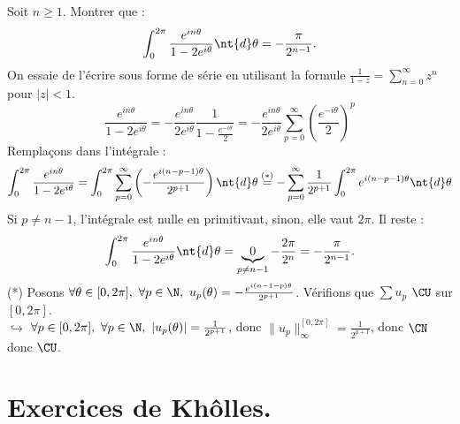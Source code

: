 \documentclass[11pt]{article}
\begin{document}
\begin{ex}{}{}
    Soit $n\geq 1$. Montrer que :
    \begin{equation*}
        \int_0^{2\pi}\frac{e^{in\theta}}{1-2e^{i\theta}}\nt{d}\theta = -\frac{\pi}{2^{n-1}}.
    \end{equation*}
    \tcblower
    On essaie de l'écrire sous forme de série en utilisant la formule $\frac{1}{1-z}=\sum_{n=0}^\infty z^n$ pour $|z|<1$.
    \begin{equation*}
        \frac{e^{in\theta}}{1-2e^{i\theta}} = -\frac{e^{in\theta}}{2e^{i\theta}} \frac{1}{1-\frac{e^{-i\theta}}{2}} = -\frac{e^{in\theta}}{2e^{i\theta}}\sum_{p=0}^{\infty}\left(\frac{e^{-i\theta}}{2}\right)^p
    \end{equation*}
    Remplaçons dans l'intégrale :
    \begin{equation*}
        \int_0^{2\pi}\frac{e^{in\theta}}{1-2e^{i\theta}} = \int_0^{2\pi} \sum_{p=0}^{\infty}\left( -\frac{e^{i(n-p-1)\theta}}{2^{p+1}} \right) \nt{d}\theta\overset{(*)}{=}-\sum_{p=0}^{\infty}\frac{1}{2^{p+1}}\int_0^{2\pi}e^{i(n-p-1)\theta}\nt{d}\theta
    \end{equation*}
    Si $p\neq n-1$, l'intégrale est nulle en primitivant, sinon, elle vaut $2\pi$. Il reste :
    \begin{equation*}
        \int_0^{2\pi}\frac{e^{in\theta}}{1-2e^{i\theta}}\nt{d}\theta = \underbrace{0}_{p\neq n-1}-\frac{2\pi}{2^n} = -\frac{\pi}{2^{n-1}}.
    \end{equation*}
    (*) Posons $\forall \theta \in [0,2\pi], ~ \forall p \in \N, ~ u_p(\theta)=-\frac{e^{i(n-1-p)\theta}}{2^{p+1}}$. Vérifions que $\sum u_p$ $\CU$ sur $[0,2\pi]$.\\
    $\hookrightarrow$ $\forall p \in [0,2\pi], ~ \forall p \in \N, ~ |u_p(\theta)|=\frac{1}{2^{p+1}}$, donc $\|u_p\|_\infty^{[0,2\pi]}=\frac{1}{2^{p+1}}$, donc $\CN$ donc $\CU$.
\end{ex}

\section{Exercices de Khôlles.}
\end{document}
